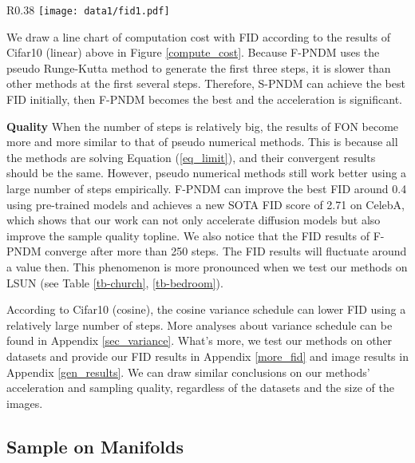 \documentclass{article}
\begin{document}
\begin{wrapfigure}{R}{0.38\linewidth}
   \vspace*{-1cm}
   \centering
   \texttt{[image: data1/fid1.pdf]}
   \caption{The FID results under different computation costs and different numerical methods on Cifar10. The unit of time is the computational cost of 1-step DDIM, which is 0.337s.}
   \label{compute_cost}
   \vspace*{-0.8cm}
\end{wrapfigure}

We draw a line chart of computation cost with FID according to the results of Cifar10 (linear) above in Figure \ref{compute_cost}. Because F-PNDM uses the pseudo Runge-Kutta method to generate the first three steps, it is slower than other methods at the first several steps. Therefore, S-PNDM can achieve the best FID initially, then F-PNDM becomes the best and the acceleration is significant. 


\textbf{Quality}
When the number of steps is relatively big, the results of FON become more and more similar to that of pseudo numerical methods. This is because all the methods are solving Equation (\ref{eq_limit}), and their convergent results should be the same. However, pseudo numerical methods still work better using a large number of steps empirically. F-PNDM can improve the best FID around 0.4 using pre-trained models and achieves a new SOTA FID score of 2.71 on CelebA, which shows that our work can not only accelerate diffusion models but also improve the sample quality topline. We also notice that the FID results of F-PNDM converge after more than 250 steps. The FID results will fluctuate around a value then. This phenomenon is more pronounced when we test our methods on LSUN (see Table \ref{tb-church}, \ref{tb-bedroom}).


According to Cifar10 (cosine), the cosine variance schedule can lower FID using a relatively large number of steps. More analyses about variance schedule can be found in Appendix \ref{sec_variance}. What's more, we test our methods on other datasets and provide our FID results in Appendix \ref{more_fid} and image results in Appendix \ref{gen_results}. We can draw similar conclusions on our methods' acceleration and sampling quality, regardless of the datasets and the size of the images.




\subsection{Sample on Manifolds}
\label{manifold_ex}
\end{document}
